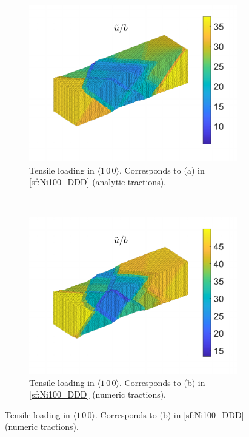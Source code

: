 \begin{figure}
    \centering
    \begin{subfigure}[t]{0.45\linewidth}
        \centering
        \includegraphics[width=\linewidth]{../data/11-Mar-2021_8_tensile_ni_100_196800_disp.pdf}
        \caption{Tensile loading in $\langle 1\, 0\, 0 \rangle$. Corresponds to (a) in \cref{sf:Ni100_DDD} (analytic tractions).}
        \label{sf:Ni100a_disp}
    \end{subfigure}
    ~
    \begin{subfigure}[t]{0.45\linewidth}
        \centering
        \includegraphics[width=\linewidth]{../data/11-Mar-2021_numT_8_tensile_ni_100_168600_disp.pdf}
        \caption{Tensile loading in $\langle 1\, 0\, 0 \rangle$. Corresponds to (b) in \cref{sf:Ni100_DDD} (numeric tractions).}
        \label{sf:Ni100aN_disp}
    \end{subfigure}


\end{figure}

